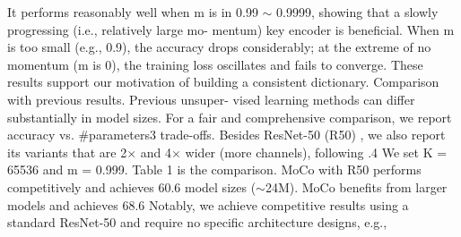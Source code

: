 \documentclass[10pt,twocolumn]{article}  %
\begin{document}
It performs reasonably well when m is in 0.99 $\sim $ 0.9999,
showing that a slowly progressing (i.e., relatively large mo-
mentum) key encoder is beneﬁcial. When m is too small
(e.g., 0.9), the accuracy drops considerably; at the extreme
of no momentum (m is 0), the training loss oscillates and
fails to converge. These results support our motivation of
building a consistent dictionary.
Comparison with previous results. Previous unsuper-
vised learning methods can differ substantially in model
sizes. For a fair and comprehensive comparison, we report
accuracy vs. \#parameters3 trade-offs. Besides ResNet-50
(R50) \cite{33_he2016deep}, we also report its variants that are 2$\times $ and 4$\times $
wider (more channels), following \cite{38_kolesnikov2019revisiting}.4 We set K = 65536
and m = 0.999. Table 1 is the comparison.
MoCo with R50 performs competitively and achieves
60.6%
model sizes ($\sim $24M). MoCo beneﬁts from larger models and
achieves 68.6%
Notably, we achieve competitive results using a standard
ResNet-50 and require no speciﬁc architecture designs, e.g.,
\end{document}
